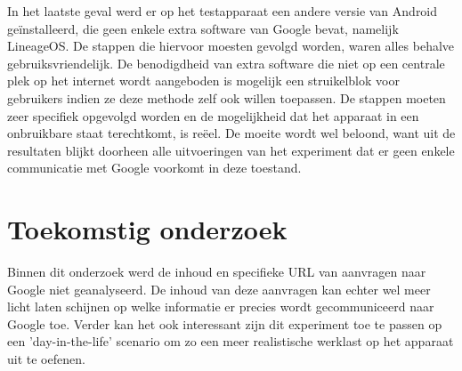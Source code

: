 \documentclass[a0,portrait]{a0poster}
\begin{document}
\begin{multicols}{2}
In het laatste geval werd er op het testapparaat een andere versie van Android geïnstalleerd, die geen enkele extra software van Google bevat, namelijk LineageOS. De stappen die hiervoor moesten gevolgd worden, waren alles behalve gebruiksvriendelijk. De benodigdheid van extra software die niet op een centrale plek op het internet wordt aangeboden is mogelijk een struikelblok voor gebruikers indien ze deze methode zelf ook willen toepassen. De stappen moeten zeer specifiek opgevolgd worden en de mogelijkheid dat het apparaat in een onbruikbare staat terechtkomt, is reëel. De moeite wordt wel beloond, want uit de resultaten blijkt doorheen alle uitvoeringen van het experiment dat er geen enkele communicatie met Google voorkomt in deze toestand.
\color{HoGentAccent1} 
\section*{Toekomstig onderzoek}
\color{black}

Binnen dit onderzoek werd de inhoud en specifieke URL van aanvragen naar Google niet geanalyseerd. De inhoud van deze aanvragen kan echter wel meer licht laten schijnen op welke informatie er precies wordt gecommuniceerd naar Google toe. Verder kan het ook interessant zijn dit experiment toe te passen op een 'day-in-the-life' scenario om zo een meer realistische werklast op het apparaat uit te oefenen.



\end{multicols}
\end{document}

